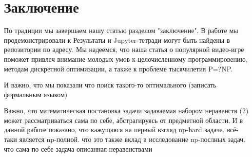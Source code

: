 \documentclass{article}
\begin{document}
\section{Заключение}
\label{SectionConclusion}
По традиции мы завершаем нашу статью разделом "заключение". 
В работе мы продемонстрировали к 
Результаты и Jupyter-тетради могут быть найдены в репозитории по адресу. 
Мы надеемся, что наша статья о популярной видео-игре  поможет привлеч внимание молодых умов к целочисленному программировению, методам дискретной оптимизации, а также к проблеме тысячилетия P=?NP. 

И важно, что мы показали что поиск такого-то оптимального (записать формальным языком)

Важно, что математическая постановка задачи задаваемая набором неравенств (2) может  рассматриваться сама по себе, абстрагируясь от предметной области. И в данной работе показано, что кажущаяся на первый взгляд np-hard задача, всё-таки является np-полной. 
что это также вклад в исследование np-послных задач. 
что сама по себе задача описанная неравенствами 



\end{document}
